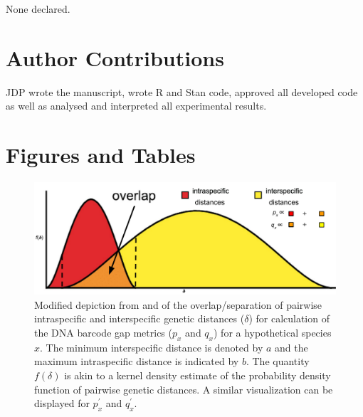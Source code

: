 \documentclass[12pt]{article}
\begin{document}
None declared.

\section*{Author Contributions}

JDP wrote the manuscript, wrote R and Stan code, approved all developed code as well as analysed and interpreted all experimental results. 




\section*{Figures and Tables}

\begin{figure}[H]

\centering

\includegraphics[width=1.0\textwidth]{Figure 1}

\caption{Modified depiction from \citet{meyer2005dna} and \citet{phillips2024measure} of the overlap/separation of pairwise intraspecific and interspecific genetic distances ($\delta$) for calculation of the DNA barcode gap metrics ($p_x$ and $q_x$) for a hypothetical species $x$. The minimum interspecific distance is denoted by $a$ and the maximum intraspecific distance is indicated by $b$. The quantity $f(\delta)$ is akin to a kernel density estimate of the probability density function of pairwise genetic distances. A similar visualization can be displayed for $p^{'}_x$ and $q^{'}_x$.}

\end{figure}
\end{document}
